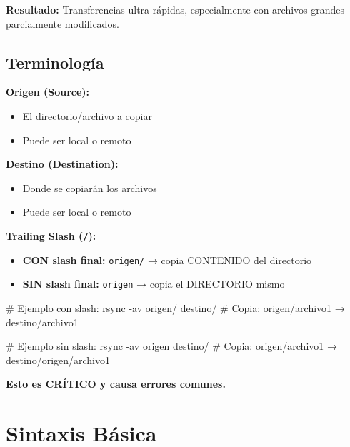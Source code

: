 \documentclass[
  doc,
  floatsintext,
  longtable,
  a4paper,
  nolmodern,
  notxfonts,
  notimes,
  12pt,
  colorlinks=true,linkcolor=blue,citecolor=blue,urlcolor=blue]{apa7}
\newenvironment{Shaded}{\begin{snugshade}}{\end{snugshade}}
\newcommand{\AttributeTok}[1]{\textcolor[rgb]{0.40,0.45,0.13}{#1}}
\newcommand{\CommentTok}[1]{\textcolor[rgb]{0.37,0.37,0.37}{#1}}
\newcommand{\FunctionTok}[1]{\textcolor[rgb]{0.28,0.35,0.67}{#1}}
\newcommand{\NormalTok}[1]{\textcolor[rgb]{0.00,0.23,0.31}{#1}}
\providecommand{\tightlist}{%
  \setlength{\itemsep}{0pt}\setlength{\parskip}{0pt}}
\begin{document}
\textbf{Resultado:} Transferencias ultra-rápidas, especialmente con
archivos grandes parcialmente modificados.

\subsection{Terminología}\label{terminologuxeda}

\textbf{Origen (Source):}

\begin{itemize}
\tightlist
\item
  El directorio/archivo a copiar
\item
  Puede ser local o remoto
\end{itemize}

\textbf{Destino (Destination):}

\begin{itemize}
\tightlist
\item
  Donde se copiarán los archivos
\item
  Puede ser local o remoto
\end{itemize}

\textbf{Trailing Slash (\texttt{/}):}

\begin{itemize}
\tightlist
\item
  \textbf{CON slash final:} \texttt{origen/} → copia CONTENIDO del
  directorio
\item
  \textbf{SIN slash final:} \texttt{origen} → copia el DIRECTORIO mismo
\end{itemize}

\begin{Shaded}
\begin{Highlighting}[]
\CommentTok{\# Ejemplo con slash:}
\FunctionTok{rsync} \AttributeTok{{-}av}\NormalTok{ origen/ destino/}
\CommentTok{\# Copia: origen/archivo1 → destino/archivo1}

\CommentTok{\# Ejemplo sin slash:}
\FunctionTok{rsync} \AttributeTok{{-}av}\NormalTok{ origen destino/}
\CommentTok{\# Copia: origen/archivo1 → destino/origen/archivo1}
\end{Highlighting}
\end{Shaded}

\textbf{Esto es CRÍTICO y causa errores comunes.}

\section{Sintaxis Básica}\label{sintaxis-buxe1sica}
\end{document}
